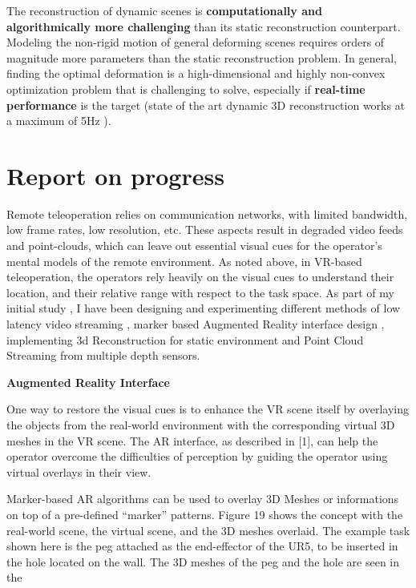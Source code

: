 The reconstruction of dynamic scenes is \textbf{computationally and algorithmically more challenging } than its static reconstruction counterpart. Modeling the non-rigid motion of general deforming scenes requires orders of magnitude more parameters than the static reconstruction problem. In general, finding the optimal deformation is a high-dimensional and highly non-convex optimization problem that is challenging to solve, especially if \textbf{real-time performance} is the target (state of the art dynamic 3D reconstruction works at a maximum of 5Hz \cite{inproceedings}).

\section{Report on progress}

Remote  teleoperation  relies  on  communication  networks,  with  limited  bandwidth,  low  frame  rates,  low  resolution,  etc.  These  aspects  result  in  degraded  video  feeds  and  point-clouds,  which  can  leave  out essential visual cues for the operator’s mental models of the remote environment. As noted above, in VR-based teleoperation, the operators rely heavily on the visual cues to understand their location, and their relative range with respect to the task space. 
As part of my initial study , I have been designing and experimenting different methods of low latency video streaming , marker based Augmented Reality interface design , implementing 3d Reconstruction for static environment and Point Cloud Streaming from multiple depth sensors.

\textbf{Augmented Reality Interface}

One way to restore the visual cues is to enhance the VR scene itself by overlaying the objects from the real-world environment with the corresponding virtual 3D meshes in the VR scene. The AR interface, as  described  in  [1],  can  help  the  operator  overcome  the  difficulties  of  perception  by  guiding  the  operator using virtual overlays in their view.

Marker-based AR algorithms can be used to overlay 3D Meshes or informations on top of a  pre-defined “marker” patterns. Figure 19 shows the concept with the real-world scene, the virtual scene,  and  the  3D  meshes  overlaid.  The  example  task  shown  here  is  the  peg  attached  as  the  end-effector of the UR5, to be inserted in the hole located on the wall. The 3D meshes of the peg and the hole are seen in the 


